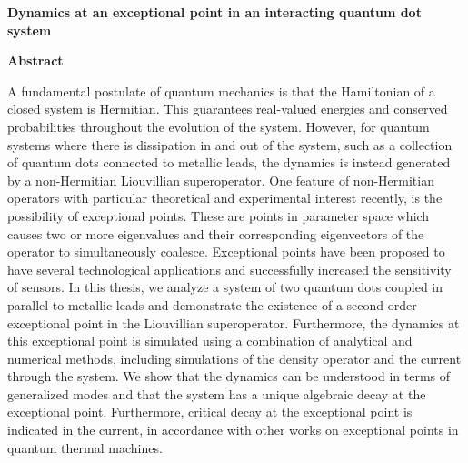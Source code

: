 \documentclass[../main.tex]{subfiles}
\begin{document}
\thispagestyle{plain}
\begin{center}
    \Large
    \textbf{Dynamics at an exceptional point in an interacting quantum dot system}
    
    \vspace{0.4cm}
    
    \vspace{0.4cm}
    
    \vspace{0.9cm}
    \textbf{Abstract}
\end{center}
A fundamental postulate of quantum mechanics is that the Hamiltonian of a closed system is Hermitian. This guarantees real-valued energies and conserved probabilities throughout the evolution of the system. However, for quantum systems where there is dissipation in and out of the system, such as a collection of quantum dots connected to metallic leads, the dynamics is instead generated by a non-Hermitian Liouvillian superoperator. One feature of non-Hermitian operators with particular theoretical and experimental interest recently, is the possibility of exceptional points. These are points in parameter space which causes two or more eigenvalues and their corresponding eigenvectors of the operator to simultaneously coalesce. Exceptional points have been proposed to have several technological applications and successfully increased the sensitivity of sensors. In this thesis, we analyze a system of two quantum dots coupled in parallel to metallic leads and demonstrate the existence of a second order exceptional point in the Liouvillian superoperator. Furthermore, the dynamics at this exceptional point is simulated using a combination of analytical and numerical methods, including simulations of the density operator and the current through the system. We show that the dynamics can be understood in terms of generalized modes and that the system has a unique algebraic decay at the exceptional point. Furthermore, critical decay at the exceptional point is indicated in the current, in accordance with other works on exceptional points in quantum thermal machines.
\end{document}
